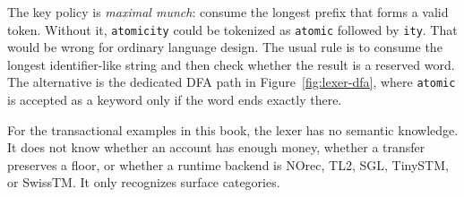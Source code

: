 The key policy is \emph{maximal munch}: consume the longest prefix that forms a valid token. Without it, \texttt{atomicity} could be tokenized as \texttt{atomic} followed by \texttt{ity}. That would be wrong for ordinary language design. The usual rule is to consume the longest identifier-like string and then check whether the result is a reserved word. The alternative is the dedicated DFA path in Figure~\ref{fig:lexer-dfa}, where \texttt{atomic} is accepted as a keyword only if the word ends exactly there.

For the transactional examples in this book, the lexer has no semantic knowledge. It does not know whether an account has enough money, whether a transfer preserves a floor, or whether a runtime backend is NOrec, TL2, SGL, TinySTM, or SwissTM. It only recognizes surface categories.

